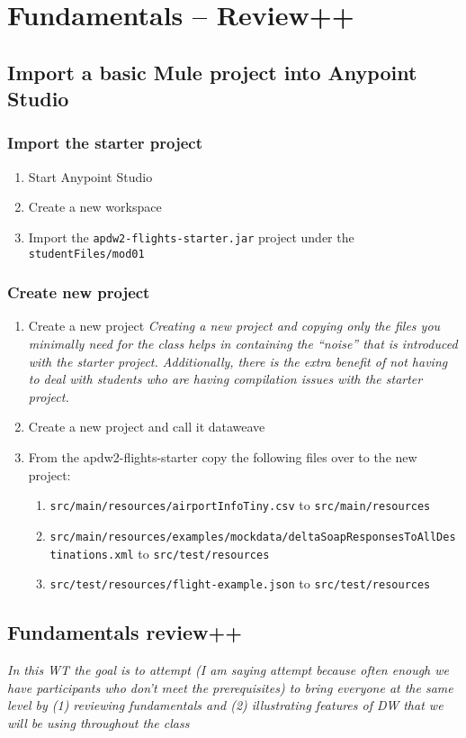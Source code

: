 \chapter{Fundamentals -- Review++}
\section{Import a basic Mule project into Anypoint Studio}
\subsection{Import the starter project}
\begin{enumerate}
\item Start Anypoint Studio
\item Create a new workspace
\item Import the \texttt{apdw2-flights-starter.jar} project under the \texttt{studentFiles/mod01}
\end{enumerate}
\subsection{Create new project}
\begin{enumerate}[resume*]
\item Create a new project
  \newline
  \emph{
    Creating a new project and copying only the files you minimally need for the class helps in containing the ``noise'' that is introduced with the starter project.  Additionally, there is the extra benefit of not having to deal with students who are having compilation issues with the starter project.
  }
\item Create a new project and call it dataweave
\item From the apdw2-flights-starter copy the following files over to the new project:
  \begin{enumerate}
  \item \texttt{src/main/resources/airportInfoTiny.csv} to \texttt{src/main/resources}
  \item \texttt{src/main/resources/examples/mockdata/deltaSoapResponsesToAllDestinations.xml} to \texttt{src/test/resources}
  \item \texttt{src/test/resources/flight-example.json} to \texttt{src/test/resources}
  \end{enumerate}
\end{enumerate}

\section{Fundamentals review++}
\emph{
  In this WT the goal is to attempt (I am saying attempt because often enough we have participants who don’t meet the prerequisites) to bring everyone at the same level by (1) reviewing fundamentals and (2) illustrating features of DW that we will be using throughout the class
}

